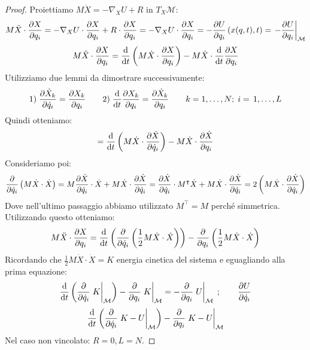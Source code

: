 \begin{proof}
    Proiettiamo $M\ddot{X} = -\nabla_X U + R$ in $T_X\mathcal{M}$:
    \begin{equation*}
        M\ddot{X}\cdot \pdv{X}{q_i}= -\nabla_X U \cdot \pdv{X}{q_i}+ R\cdot\pdv{X}{q_i}= -\nabla_X U \cdot \pdv{X}{q_i}
        = -\pdv{U}{q_i}\left( x(q,t),t   \right)= \eval{ -\pdv{U}{q_i}}_{\mathcal{M}}
    \end{equation*}
    \begin{equation}
        M\ddot{X}\cdot \pdv{X}{q_i}= \dv{}{t}\left( M\dot{X}\cdot \pdv{X}{q_i} \right)-M\dot{X}\cdot\dv{}{t}\pdv{X}{q_i}
    \end{equation}
    Utilizziamo due lemmi da dimostrare successivamente:
    \begin{equation}
        1) \; \pdv{\dot{X}_k}{\dot{q}_i}= \pdv{X_k}{q_i} \qquad 2)\; \dv{}{t}\pdv{X_k}{q_i}= \pdv{\dot{X}_k}{q_i}\qquad k = 1,\dots,N;\; i = \, 1,\dots, L 
    \end{equation}
    Quindi otteniamo:
    \begin{equation*}
        = \dv{}{t}\left( M\dot{X}\cdot\pdv{\dot{X}}{\dot{q}_i} \right)-M\dot{X}\cdot \pdv{\dot{X}}{q_i}
    \end{equation*}
    Consideriamo poi:
    \begin{equation*}
        \pdv{}{\dot{q}_i}\left( M\dot{X}\cdot\dot{X} \right)= M\pdv{\dot{X}}{\dot{q}_i}\cdot\dot{X}+ M\dot{X}\cdot\pdv{\dot{X}}{\dot{q}_i}=
        \pdv{\dot{X}}{\dot{q}_i}\cdot M^\intercal \dot{X} + M\dot{X}\cdot\pdv{\dot{X}}{\dot{q}_i}= 2\left( M\dot{X}\cdot\pdv{\dot{X}}{\dot{q}_i} \right)
    \end{equation*}
    Dove nell'ultimo passaggio abbiamo utilizzato $M^\intercal= M$ perché simmetrica. Utilizzando questo otteniamo:
    \begin{equation*}
        M\ddot{X}\cdot\pdv{X}{q_i}= \dv{}{t}\left( \pdv{}{\dot{q}_i }\left( \frac{1}{2}M\dot{X}\cdot\dot{X} \right) \right)- \pdv{}{q_i}\left( \frac{1}{2}M\dot{X}\cdot\dot{X} \right)
    \end{equation*}
    Ricordando che $\frac{1}{2}M\dot{X}\cdot\dot{X}= K$ energia cinetica del sistema e eguagliando alla prima equazione:
    \begin{equation*}
        \dv{}{t} \left( \pdv{\dot{q}_i} \eval{K}_{\mathcal{M}} \right)- \pdv{}{q_i}\eval{K}_{\mathcal{M}}= -\pdv{}{q_i} \eval{U}_{\mathcal{M}} \;;\qquad \pdv{U}{\dot{q}_i}
    \end{equation*}
    \begin{equation}
        \dv{}{t}\left( \pdv{}{\dot{q}_i} \eval{K-U}_{\mathcal{M}} \right)-\pdv{}{q_i}\eval{K-U}_{\mathcal{M}}
    \end{equation}
    Nel caso non vincolato: $R = 0, L = N$.
\end{proof}

